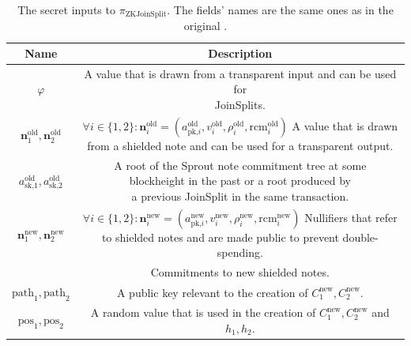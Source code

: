 \documentclass{article}
\begin{document}
\begin{center}
\begin{table}
{\tiny
\begin{tabular}{ |c|c| } 
        \hline
        \textbf{Name} & \textbf{Description} \\
        \hline
        \rule{0pt}{4ex} {\small $\varphi$} & \makecell{A value that is drawn from a transparent input and can be used for\\ JoinSplits.} \\
        \hline
        \rule{0pt}{4ex} {\small $\boldsymbol{n}^\text{old}_1,\boldsymbol{n}^\text{old}_2$} & \makecell{$\forall i \in \{1,2\}\colon \boldsymbol{n}^\text{old}_i = (a_\text{pk,$i$}^\text{old}, v_i^\text{old}, \rho_i^\text{old}, \text{rcm}_i^\text{old})$\\ A value that is drawn from a shielded note and can be used for\\ a transparent output.} \\
        \hline
        \rule{0pt}{4ex} {\small $a_\text{sk,$1$}^\text{old},a_\text{sk,$2$}^\text{old}$} & \makecell{A root of the Sprout note commitment tree at some \\ blockheight in the past or a root produced by\\ a previous JoinSplit in the same transaction.} \\
        \hline
        \rule{0pt}{4ex} {\small $\boldsymbol{n}^\text{new}_1,\boldsymbol{n}^\text{new}_2$} & \makecell{$\forall i \in \{1,2\}\colon \boldsymbol{n}^\text{new}_i = (a_\text{pk,$i$}^\text{new}, v_i^\text{new}, \rho_i^\text{new}, \text{rcm}_i^\text{new})$\\ Nullifiers that refer to shielded notes and are made public to prevent\\ double-spending.} \\
        \hline
        \rule{0pt}{4ex} {\small \makecell{$\text{enforceMerklePath}_1$,\\ $\text{enforceMerklePath}_2$}} & Commitments to new shielded notes. \\
        \hline
        \rule{0pt}{4ex} {\small $\text{path}_1,\text{path}_2$} & A public key relevant to the creation of $C_1^\text{new}, C_2^\text{new}$. \\
        \hline
        \rule{0pt}{4ex} {\small $\text{pos}_1, \text{pos}_2$} & \makecell{A random value that is used in the creation of $C_1^\text{new}, C_2^\text{new}$ and\\ $h_1, h_2$.} \\
        \hline
\end{tabular}}
\caption{The secret inputs to $\pi_\text{ZKJoinSplit}$. The fields' names are the same ones as in the original \protect\cite{hopwood:zcash}.} \label{fig:secretinputs}
\end{table}
\end{center}
\end{document}
